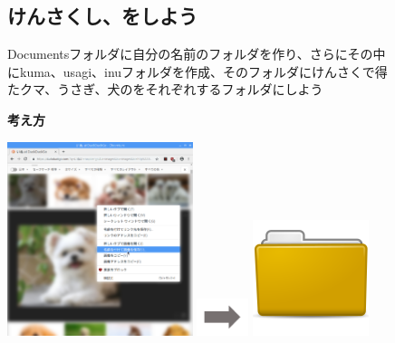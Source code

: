 \documentclass[a4paper,12pt]{jarticle}
\begin{document}
\begin{figure}[t]
  \subsection{\theExercise 
    けんさくし、をしよう}
  Documentsフォルダに自分の名前のフォルダを作り、さらにその中にkuma、usagi、inuフォルダを作成、そのフォルダにけんさくで得たクマ、うさぎ、犬のをそれぞれするフォルダにしよう

  \textbf{考え方}


  \bigskip




  \centering
  \begin{minipage}{\textwidth}
    \begin{minipage}{5.582cm}
      \includegraphics[width=5.413cm]{textbook-img092.png}
    \end{minipage}
    \begin{minipage}{3.582cm}
      \includegraphics[width=1.505cm]{textbook-img073.png}
    \end{minipage}
    \begin{minipage}{5.582cm}
      \includegraphics[width=3.387cm]{textbook-img044.png}
    \end{minipage}
  \end{minipage}



\end{figure}
\end{document}
